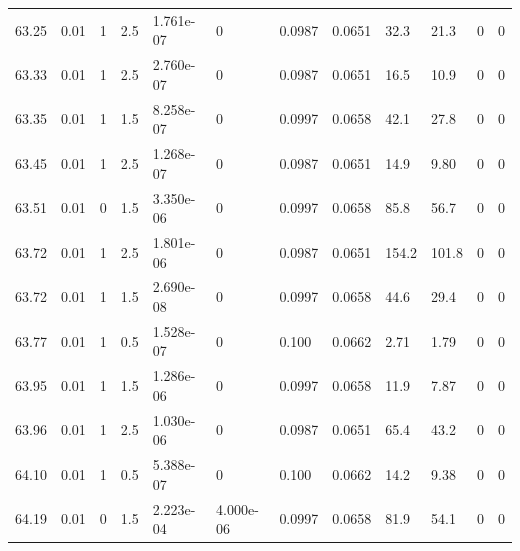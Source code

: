 \documentclass[preview]{standalone}
\begin{document}
{{{{{{{{{{{{{{\begin{tabular}{L{1.2cm}C{1.2cm} C{0.3cm}C{0.5cm} C{1.4cm}C{1.4cm} C{1.4cm}C{1.4cm} C{1.6cm}C{1.6cm} C{1.6cm}C{1.6cm}}
  63.25  &  0.01  & 1     & 2.5 &  1.761e-07  & 0  &  0.0987&   0.0651& 32.3 & 21.3   &  0 & 0  \\ 
  63.33  &  0.01  & 1     & 2.5 &  2.760e-07  & 0  &  0.0987&   0.0651& 16.5 & 10.9   &  0 & 0  \\ 
  63.35  &  0.01  & 1     & 1.5 &  8.258e-07  & 0  &  0.0997&   0.0658& 42.1 & 27.8   &  0 & 0  \\ 
  63.45  &  0.01  & 1     & 2.5 &  1.268e-07  & 0  &  0.0987&   0.0651& 14.9 & 9.80   &  0 & 0  \\ 
  63.51  &  0.01  & 0     & 1.5 &  3.350e-06  & 0  &  0.0997&   0.0658& 85.8 & 56.7   &  0 & 0  \\ 
  63.72  &  0.01  & 1     & 2.5 &  1.801e-06  & 0  &  0.0987&   0.0651& 154.2 & 101.8   &  0 & 0  \\ 
  63.72  &  0.01  & 1     & 1.5 &  2.690e-08  & 0  &  0.0997&   0.0658& 44.6 & 29.4   &  0 & 0  \\ 
  63.77  &  0.01  & 1     & 0.5 &  1.528e-07  & 0  &  0.100&   0.0662& 2.71 & 1.79   &  0 & 0  \\ 
  63.95  &  0.01  & 1     & 1.5 &  1.286e-06  & 0  &  0.0997&   0.0658& 11.9 & 7.87   &  0 & 0  \\ 
  63.96  &  0.01  & 1     & 2.5 &  1.030e-06  & 0  &  0.0987&   0.0651& 65.4 & 43.2   &  0 & 0  \\ 
  64.10  &  0.01  & 1     & 0.5 &  5.388e-07  & 0  &  0.100&   0.0662& 14.2 & 9.38   &  0 & 0  \\ 
  64.19  &  0.01  & 0     & 1.5 &  2.223e-04  & 4.000e-06  &  0.0997&   0.0658& 81.9 & 54.1   &  0 & 0  \\ 
\hline 
\end{tabular} 

}}}}}}}}}}}}}}
\end{document}
